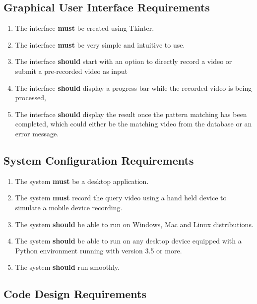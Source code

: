 \subsection{Graphical User Interface Requirements}

\begin{enumerate}
    \item The interface \textbf{must} be created using Tkinter.
    \item The interface \textbf{must} be very simple and intuitive to use.
    \item The interface \textbf{should} start with an option to directly record a video or submit a pre-recorded video as input
    \item The interface \textbf{should} display a progress bar while the recorded video is being processed, 
    \item The interface \textbf{should} display the result once the pattern matching has been completed, which could either be the matching video from the database or an error message.
\end{enumerate}

\subsection{System Configuration Requirements}

\begin{enumerate}
    \item The system \textbf{must} be a desktop application.
    \item The system \textbf{must} record the query video using a hand held device to simulate a mobile device recording.
    \item The system \textbf{should} be able to run on Windows, Mac and Linux distributions.
    \item The system \textbf{should} be able to run on any desktop device equipped with a Python environment running with version 3.5 or more.
    \item The system \textbf{should} run smoothly.
\end{enumerate}

\subsection{Code Design Requirements}

